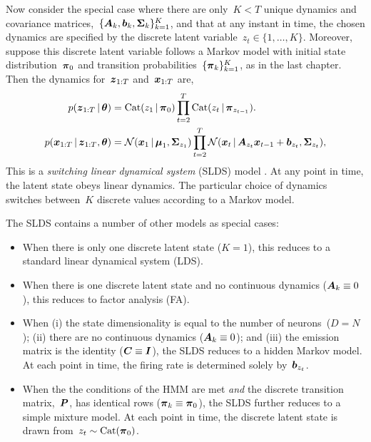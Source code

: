 Now consider the special case where there are only~$K<T$ unique dynamics
and covariance matrices,~${\{\boldsymbol{A}_k, \boldsymbol{b}_k, \boldsymbol{\Sigma}_k\}_{k=1}^K}$, and that at
any instant in time, the chosen dynamics are specified by the
discrete latent variable~${z_t \in \{1, \ldots, K\}}$. Moreover,
suppose this discrete latent variable follows a Markov model with 
initial state distribution~$\boldsymbol{\pi}_0$ and transition probabilities~$\{\boldsymbol{\pi}_{k}\}_{k=1}^K$,
as in the last chapter. Then the dynamics for~$\boldsymbol{z}_{1:T}$ and~$\boldsymbol{x}_{1:T}$
are,
\begin{align*}
  p(\boldsymbol{z}_{1:T} \,|\, \boldsymbol{\theta}) 
  &=
    \mathrm{Cat}(z_1\,|\, \boldsymbol{\pi}_0)
    \prod_{t=2}^T \mathrm{Cat}(z_t \,|\, \boldsymbol{\pi}_{z_{t-1}}).
  \\
  p(\boldsymbol{x}_{1:T} \,|\, \boldsymbol{z}_{1:T}, \boldsymbol{\theta})
  &= 
    \mathcal{N}(\boldsymbol{x}_1 \,|\, \boldsymbol{\mu}_1, \boldsymbol{\Sigma}_{z_1})
    \prod_{t=2}^T \mathcal{N}(\boldsymbol{x}_t \,|\, \boldsymbol{A}_{z_t} \boldsymbol{x}_{t-1} + \boldsymbol{b}_{z_t}, \boldsymbol{\Sigma}_{z_t}),
\end{align*}
This is a \emph{switching linear dynamical system} (SLDS) 
model \citep{murphy2012probabilistic, fox2009bayesian}. 
At any point in time, the latent state obeys linear dynamics.
The particular choice of dynamics switches between~$K$ discrete values
according to a Markov model.

The SLDS contains a number of other models as special cases:
\begin{itemize}
\item When there is only one discrete latent state ($K=1$), this
  reduces to a standard linear dynamical system (LDS).
  
\item When there is one discrete latent state and no continuous dynamics
  (${\boldsymbol{A}_k \equiv 0}$), this reduces to factor analysis (FA).

\item When (i) the state dimensionality is equal to the number of
  neurons~($D=N$); (ii) there are no continuous dynamics (${\boldsymbol{A}_k
    \equiv 0}$); and (iii) the emission matrix is the identity (${\boldsymbol{C}
    \equiv \boldsymbol{I}}$), the SLDS reduces to a hidden Markov model. At each
  point in time, the firing rate is determined solely
  by~$\boldsymbol{b}_{z_t}$.

\item When the the conditions of the HMM are met \emph{and} the
  discrete transition matrix,~$\boldsymbol{P}$, has identical rows (${\boldsymbol{\pi}_k
    \equiv \boldsymbol{\pi}_0}$), the SLDS further reduces to a simple mixture
  model. At each point in time, the discrete latent state is drawn
  from~${z_t \sim \mathrm{Cat}(\boldsymbol{\pi}_0)}$.
\end{itemize}

